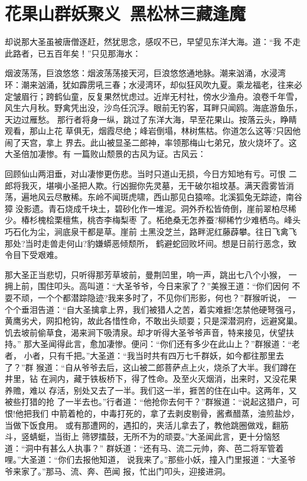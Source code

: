 \chapter{花果山群妖聚义~黑松林三藏逢魔}

却说那大圣虽被唐僧逐赶，然犹思念，感叹不已，早望见东洋大海。道：“我
不走此路者，已五百年矣！”只见那海水：

烟波荡荡，巨浪悠悠：烟波荡荡接天河，巨浪悠悠通地脉。潮来汹涌，水浸湾
环：潮来汹涌，犹如霹雳吼三春；水浸湾环，却似狂风吹九夏。乘龙福老，往来必
定皱眉行；跨鹤仙童，反复果然忧虑过。近岸无村社，傍水少渔舟。浪卷千年雪，
风生六月秋。野禽凭出没，沙鸟任沉浮。眼前无钓客，耳畔只闻鸥。海底游鱼乐，
天边过雁愁。
那行者将身一纵，跳过了东洋大海，早至花果山。按落云头，睁睛观看，那山上花
草俱无，烟霞尽绝；峰岩倒塌，林树焦枯。你道怎么这等?只因他闹了天宫，拿上
界去。此山被显圣二郎神，率领那梅山七弟兄，放火烧坏了。这大圣倍加凄惨。有
一篇败山颓景的古风为证。古风云：

回顾仙山两泪垂，对山凄惨更伤悲。当时只道山无损，今日方知地有亏。可恨
二郎将我灭，堪嗔小圣把人欺。行凶掘你先灵墓，无干破尔祖坟基。满天霞雾皆消
荡，遍地风云尽散稀。东岭不闻斑虎啸，西山那见白猿啼。北溪狐兔无踪迹，南谷
獐没影遗。青石烧成千块土，碧砂化作一堆泥。洞外乔松皆倚倒，崖前翠柏尽稀
少。椿杉槐桧栗檀焦，桃杏李梅梨枣
了。柘绝桑无怎养蚕?柳稀竹少难栖鸟。峰头巧石化为尘，涧底泉干都是草。崖前
土黑没芝兰，路畔泥红藤薜攀。往日飞禽飞那处?当时走兽走何山?豹嫌蟒恶倾颓所，
鹤避蛇回败坏间。想是日前行恶念，致令目下受艰难。

那大圣正当悲切，只听得那芳草坡前，曼荆凹里，响一声，跳出七八个小猴，
一拥上前，围住叩头。高叫道：“大圣爷爷，今日来家了？”美猴王道：“你们因何
不耍不顽，一个个都潜踪隐迹?我来多时了，不见你们形影，何也？”群猴听说，
一个个垂泪告道：“自大圣擒拿上界，我们被猎人之苦，着实难捱!怎禁他硬弩强弓，
黄鹰劣犬，网扣枪钩，故此各惜性命，不敢出头顽耍；只是深潜洞府，远避窝巢。
饥去坡前偷草食，渴来涧下吸清泉。却才听得大圣爷爷声音，特来接见，伏望扶持。”
那大圣闻得此言，愈加凄惨。便问：“你们还有多少在此山上？”群猴道：“老者，
小者，只有千把。”大圣道：“我当时共有四万七千群妖，如今都往那里去了？”群
猴道：“自从爷爷去后，这山被二郎菩萨点上火，烧杀了大半。我们蹲在井里，钻
在涧内，藏于铁板桥下，得了性命。及至火灭烟消，出来时，又没花果养赡，难以
存活，别处又去了一半。我们这一半，捱苦的住在山中。这两年，又被些打猎的抢
了一半去也。”行者道：“他抢你去何干？”群猴道：“说起这猎户，可恨!他把我们
中箭着枪的，中毒打死的，拿了去剥皮剔骨，酱煮醋蒸，油煎盐炒，当做下饭食用。
或有那遭网的，遇扣的，夹活儿拿去了，教他跳圈做戏，翻筋斗，竖蜻蜓，当街上
筛锣擂鼓，无所不为的顽耍。”大圣闻此言，更十分恼怒道：“洞中有甚么人执事？”
群妖道：“还有马、流二元帅，奔、芭二将军管着哩。”大圣道：“你们去报他知道，
说我来了。”那些小妖，撞入门里报道：“大圣爷爷来家了。”那马、流、奔、芭闻
报，忙出门叩头，迎接进洞。

